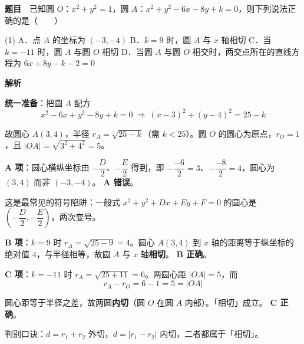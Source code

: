 \par\medskip



\textbf{题目}　已知圆 $O$：$x^2+y^2=1$，圆 $A$：$x^2+y^2-6x-8y+k=0$，则下列说法正确的是（　　）

\begin{gkopts}(1)
\task A．点 $A$ 的坐标为 $(-3,-4)$
\task B．$k=9$ 时，圆 $A$ 与 $x$ 轴相切
\task C．当 $k=-11$ 时，圆 $A$ 与圆 $O$ 相切
\task D．当圆 $A$ 与圆 $O$ 相交时，两交点所在的直线方程为 $6x+8y-k-2=0$
\end{gkopts}

\textbf{解析}

\textbf{统一准备}：把圆 $A$ 配方
\[x^2-6x+y^2-8y+k=0\ \Longrightarrow\ (x-3)^2+(y-4)^2=25-k\]

故圆心 $A(3,4)$，半径 $r_A=\sqrt{25-k}$（需 $k<25$）。圆 $O$ 的圆心为原点，$r_O=1$，且 $\left|OA\right|=\sqrt{3^2+4^2}=5$。

\par\medskip

\textbf{A 项}：圆心横纵坐标由 $-\dfrac{D}{2}$、$-\dfrac{E}{2}$ 得到，即 $-\dfrac{-6}{2}=3$、$-\dfrac{-8}{2}=4$，圆心为 $(3,4)$ 而非 $(-3,-4)$。 \textbf{A 错误}。

\begin{gktip}
这是最常见的符号陷阱：一般式 $x^2+y^2+Dx+Ey+F=0$ 的圆心是 $\left(-\dfrac{D}{2},-\dfrac{E}{2}\right)$，两次变号。
\end{gktip}

\par\medskip

\textbf{B 项}：$k=9$ 时 $r_A=\sqrt{25-9}=4$。圆心 $A(3,4)$ 到 $x$ 轴的距离等于纵坐标的绝对值 $4$，与半径相等，故圆 $A$ 与 $x$ 轴\textbf{相切}。 \textbf{B 正确}。

\par\medskip

\textbf{C 项}：$k=-11$ 时 $r_A=\sqrt{25+11}=6$。两圆心距 $\left|OA\right|=5$，而
\[r_A-r_O=6-1=5=\left|OA\right|\]

圆心距等于半径之差，故两圆\textbf{内切}（圆 $O$ 在圆 $A$ 内部）。「相切」成立。 \textbf{C 正确}。

\begin{gktip}
判别口诀：$d=r_1+r_2$ 外切，$d=\left|r_1-r_2\right|$ 内切，二者都属于「相切」。
\end{gktip}

\par\medskip

